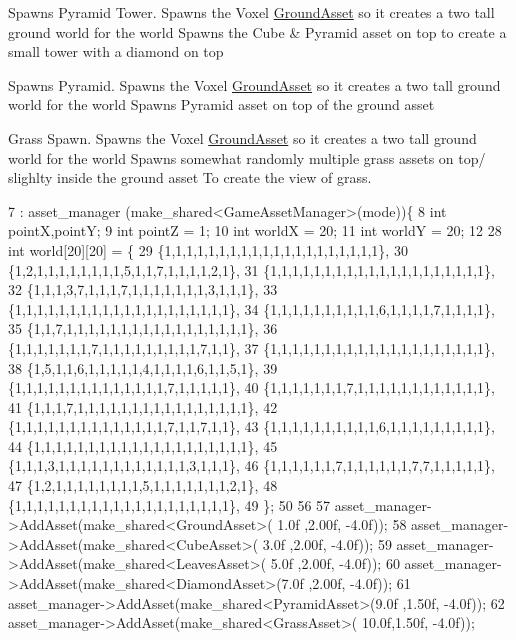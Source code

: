 Spawns Pyramid Tower. Spawns the Voxel \hyperlink{classGroundAsset}{Ground\+Asset} so it creates a two tall ground world for the world Spawns the Cube \& Pyramid asset on top to create a small tower with a diamond on top

Spawns Pyramid. Spawns the Voxel \hyperlink{classGroundAsset}{Ground\+Asset} so it creates a two tall ground world for the world Spawns Pyramid asset on top of the ground asset

Grass Spawn. Spawns the Voxel \hyperlink{classGroundAsset}{Ground\+Asset} so it creates a two tall ground world for the world Spawns somewhat randomly multiple grass assets on top/ slighlty inside the ground asset To create the view of grass.
\begin{DoxyCode}
7                                           : asset\_manager (make\_shared<GameAssetManager>(mode))\{
8   \textcolor{keywordtype}{int} pointX,pointY;
9   \textcolor{keywordtype}{int} pointZ = 1;
10   \textcolor{keywordtype}{int} worldX = 20;
11   \textcolor{keywordtype}{int} worldY = 20;
12 
28   \textcolor{keywordtype}{int} world[20][20] = \{
29   \{1,1,1,1,1,1,1,1,1,1,1,1,1,1,1,1,1,1,1,1\},
30   \{1,2,1,1,1,1,1,1,1,1,5,1,1,7,1,1,1,1,2,1\},
31   \{1,1,1,1,1,1,1,1,1,1,1,1,1,1,1,1,1,1,1,1\},
32   \{1,1,1,3,7,1,1,1,7,1,1,1,1,1,1,1,3,1,1,1\},
33   \{1,1,1,1,1,1,1,1,1,1,1,1,1,1,1,1,1,1,1,1\},
34   \{1,1,1,1,1,1,1,1,1,1,6,1,1,1,1,7,1,1,1,1\},
35   \{1,1,7,1,1,1,1,1,1,1,1,1,1,1,1,1,1,1,1,1\},
36   \{1,1,1,1,1,1,1,7,1,1,1,1,1,1,1,1,1,7,1,1\},
37   \{1,1,1,1,1,1,1,1,1,1,1,1,1,1,1,1,1,1,1,1\},
38   \{1,5,1,1,6,1,1,1,1,1,4,1,1,1,1,6,1,1,5,1\},
39   \{1,1,1,1,1,1,1,1,1,1,1,1,1,1,7,1,1,1,1,1\},
40   \{1,1,1,1,1,1,1,7,1,1,1,1,1,1,1,1,1,1,1,1\},
41   \{1,1,1,7,1,1,1,1,1,1,1,1,1,1,1,1,1,1,1,1\},
42   \{1,1,1,1,1,1,1,1,1,1,1,1,1,1,7,1,1,7,1,1\},
43   \{1,1,1,1,1,1,1,1,1,1,6,1,1,1,1,1,1,1,1,1\},
44   \{1,1,1,1,1,1,1,1,1,1,1,1,1,1,1,1,1,1,1,1\},
45   \{1,1,1,3,1,1,1,1,1,1,1,1,1,1,1,1,3,1,1,1\},
46   \{1,1,1,1,1,1,7,1,1,1,1,1,1,7,7,1,1,1,1,1\},
47   \{1,2,1,1,1,1,1,1,1,1,5,1,1,1,1,1,1,1,2,1\},
48   \{1,1,1,1,1,1,1,1,1,1,1,1,1,1,1,1,1,1,1,1\},
49   \};
50   
56 
57         asset\_manager->AddAsset(make\_shared<GroundAsset>( 1.0f ,2.00f, -4.0f));
58         asset\_manager->AddAsset(make\_shared<CubeAsset>(   3.0f ,2.00f, -4.0f));
59         asset\_manager->AddAsset(make\_shared<LeavesAsset>( 5.0f ,2.00f, -4.0f));
60         asset\_manager->AddAsset(make\_shared<DiamondAsset>(7.0f ,2.00f, -4.0f));
61         asset\_manager->AddAsset(make\_shared<PyramidAsset>(9.0f ,1.50f, -4.0f)); 
62         asset\_manager->AddAsset(make\_shared<GrassAsset>(  10.0f,1.50f, -4.0f));

\end{DoxyCode}
